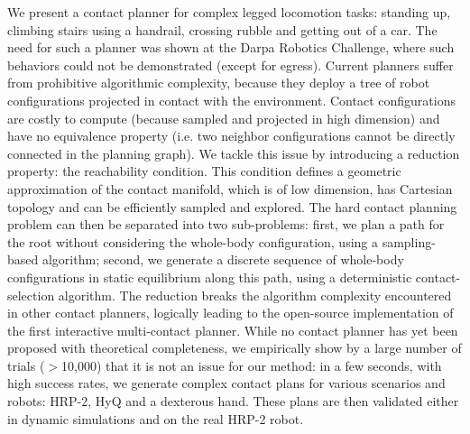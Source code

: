 We present a contact planner for complex legged locomotion tasks: standing up, climbing stairs using a handrail, crossing rubble and getting out of a car. The need for such a planner was shown at the Darpa Robotics Challenge, where such behaviors
could not be demonstrated (except for egress).
%
Current planners suffer from prohibitive algorithmic complexity, because they deploy a tree of robot configurations projected in contact with the environment.
Contact configurations are costly to compute (because sampled and projected in high dimension) and have no equivalence property (i.e. two neighbor configurations cannot be directly connected in the planning graph).
%
We tackle this issue by introducing a reduction property: the reachability condition. 
This condition defines a geometric approximation of the contact manifold, which is of low dimension, has Cartesian topology and can be efficiently sampled and explored.
%
The hard contact planning problem can then be separated into two sub-problems: 
first, we plan a path for the root without considering the whole-body configuration, using a sampling-based algorithm; 
second, we generate a discrete sequence of whole-body configurations in static equilibrium along this path, using a deterministic contact-selection algorithm. 
%
%
The reduction breaks the algorithm complexity encountered in other contact planners, logically leading to the open-source implementation of the first interactive multi-contact planner.
%
While no contact planner has yet been proposed with theoretical completeness, we empirically show by a large number of trials ($>$10,000) that it is not an issue for our method:
in a few seconds, with high success rates, we generate complex contact plans for various scenarios and robots: HRP-2, HyQ and a dexterous hand. 
These plans are then validated either in dynamic simulations and on the real HRP-2 robot.
